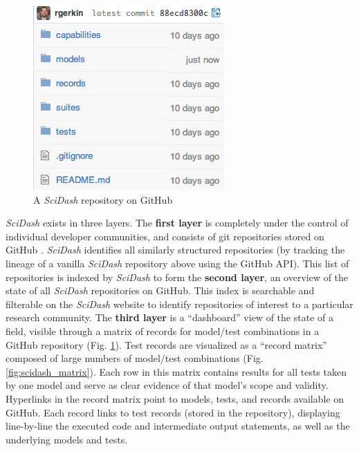 \documentclass[11pt,letterpaper]{article}
\begin{document}
\begin{figure}
\center
\vspace{-10px}
\includegraphics[scale=0.72]{scidash_github.png}
\caption{A \textit{SciDash} repository on GitHub}
\label{fig:scidash_repo}
\end{figure}
\vspace{-10px}
\leavevmode

\textit{SciDash} exists in three layers.
The \textbf{first layer} is completely under the control of individual developer communities, and consists of git repositories \cite{ram_git_2013} stored on GitHub \cite{github_url}. 
\textit{SciDash} identifies all similarly structured repositories (by tracking the lineage of a vanilla \textit{SciDash} repository above using the GitHub API).
This list of repositories is indexed by \textit{SciDash} to form the \textbf{second layer}, an overview of the state of all \textit{SciDash} repositories on GitHub.  
This index is searchable and filterable on the \textit{SciDash} website to identify repositories of interest to a particular research community.  
The \textbf{third layer} is a ``dashboard'' view of the state of a field, visible through a matrix of records for model/test combinations in a GitHub repository (Fig. \ref{fig:scidash_repo}). 
Test records are visualized as a ``record matrix'' composed of large numbers of model/test combinations (Fig. \ref{fig:scidash_matrix}).  
Each row in this matrix contains results for all tests taken by one model and serve as clear evidence of that model's scope and validity.  
Hyperlinks in the record matrix point to models, tests, and records available on GitHub. 
Each record links to test records (stored in the repository), displaying line-by-line the executed code and intermediate output statements, as well as the underlying models and tests.   
\end{document}
